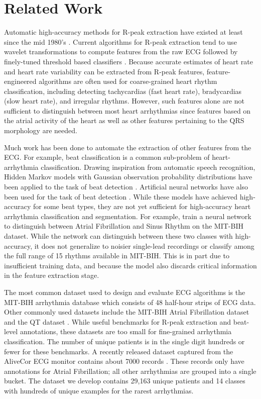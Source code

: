 \section{Related Work}
\label{sec:arrhythmia:related}

Automatic high-accuracy methods for R-peak extraction have existed at least
since the mid 1980's \cite{pan1985real}. Current algorithms for R-peak
extraction tend to use wavelet transformations to compute features from the raw
ECG followed by finely-tuned threshold based classifiers \cite{li1995detection,
martinez2004wavelet}. Because accurate estimates of heart rate and heart rate
variability can be extracted from R-peak features, feature-engineered
algorithms are often used for coarse-grained heart rhythm classification,
including detecting tachycardias (fast heart rate), bradycardias (slow heart
rate), and irregular rhythms. However, such features alone are not sufficient
to distinguish between most heart arrhythmias since features based on the
atrial activity of the heart as well as other features pertaining to the QRS
morphology are needed.

Much work has been done to automate the extraction of other features from the
ECG. For example, beat classification is a common sub-problem of
heart-arrhythmia classification. Drawing inspiration from automatic speech
recognition, Hidden Markov models with Gaussian observation probability
distributions have been applied to the task of beat detection
\cite{coast1990approach}. Artificial neural networks have also been used for
the task of beat detection \cite{melo2000arrhythmia}. While these models have
achieved high-accuracy for some beat types, they are not yet sufficient for
high-accuracy heart arrhythmia classification and segmentation. For example,
\cite{artis1991detection} train a neural network to distinguish between Atrial
Fibrillation and Sinus Rhythm on the MIT-BIH dataset. While the network can
distinguish between these two classes with high-accuracy, it does not
generalize to noisier single-lead recordings or classify among the full range
of 15 rhythms available in MIT-BIH. This is in part due to insufficient
training data, and because the model also discards critical information in the
feature extraction stage.

The most common dataset used to design and evaluate ECG algorithms is the
MIT-BIH arrhythmia database \cite{moody2001impact} which consists of 48
half-hour strips of ECG data. Other commonly used datasets include the MIT-BIH
Atrial Fibrillation dataset \cite{moody1983new} and the QT dataset
\cite{laguna1997database}. While useful benchmarks for R-peak extraction and
beat-level annotations, these datasets are too small for fine-grained
arrhythmia classification. The number of unique patients is in the single digit
hundreds or fewer for these benchmarks. A recently released dataset captured
from the AliveCor ECG monitor contains about 7000 records \cite{clifford2017}.
These records only have annotations for Atrial Fibrillation; all other
arrhythmias are grouped into a single bucket. The dataset we develop contains
29,163 unique patients and 14 classes with hundreds of unique examples for
the rarest arrhythmias.

